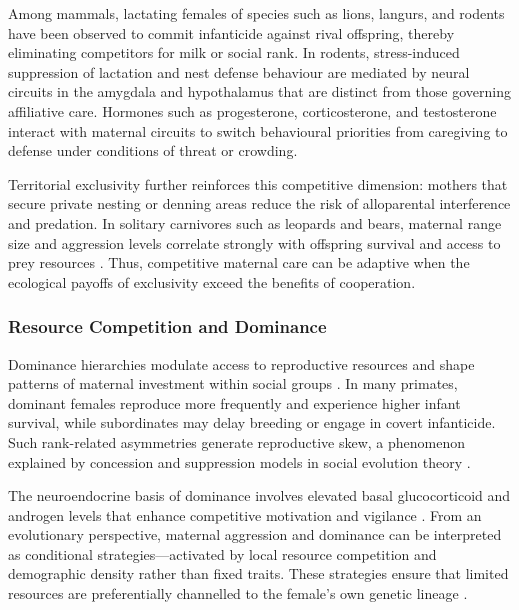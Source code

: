         Among mammals, lactating females of species such as lions, langurs, and rodents have been observed to commit infanticide against rival offspring, thereby eliminating competitors for milk or social rank. In rodents, stress-induced suppression of lactation and nest defense behaviour are mediated by neural circuits in the amygdala and hypothalamus that are distinct from those governing affiliative care. Hormones such as progesterone, corticosterone, and testosterone interact with maternal circuits to switch behavioural priorities from caregiving to defense under conditions of threat or crowding.
        
        Territorial exclusivity further reinforces this competitive dimension: mothers that secure private nesting or denning areas reduce the risk of alloparental interference and predation.  In solitary carnivores such as leopards and bears, maternal range size and aggression levels correlate strongly with offspring survival and access to prey resources \cite{lukas2014}.  Thus, competitive maternal care can be adaptive when the ecological payoffs of exclusivity exceed the benefits of cooperation.

        \subsubsection{Resource Competition and Dominance}
        Dominance hierarchies modulate access to reproductive resources and shape patterns of maternal investment within social groups \cite{cluttonbrock2007, sapolsky2005, creel2001}.  In many primates, dominant females reproduce more frequently and experience higher infant survival, while subordinates may delay breeding or engage in covert infanticide.  Such rank-related asymmetries generate reproductive skew, a phenomenon explained by concession and suppression models in social evolution theory .

        The neuroendocrine basis of dominance involves elevated basal glucocorticoid and androgen levels that enhance competitive motivation and vigilance \cite{creel2001}.  From an evolutionary perspective, maternal aggression and dominance can be interpreted as conditional strategies—activated by local resource competition and demographic density rather than fixed traits.  These strategies ensure that limited resources are preferentially channelled to the female’s own genetic lineage \cite{johnstone2000}.

